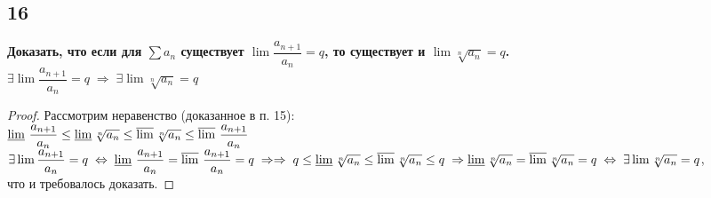 \documentclass[a4paper, fleqn]{article}
\begin{document}
    \subsection*{16}
        \textbf{ Доказать, что если для $\sum a_n$ существует $\lim \dfrac{a_{n+1}}{a_n} = q$, то существует и $\lim \sqrt[n]{a_n} = q$.} \\[5 pt]
        $\exists \lim \dfrac{a_{n+1}}{a_n} = q \; \Rightarrow \; \exists \lim \sqrt[n]{a_n} = q$ \\[3 pt]
        \begin{proof}
        Рассмотрим неравенство (доказанное в п. 15): \\[3 pt]
        $\varliminf \, \dfrac{a_{n+1}}{a_n} \le \varliminf \sqrt[n]{a_n} \le \varlimsup \sqrt[n]{a_n} 
        \le \varlimsup \, \dfrac{a_{n+1}}{a_n}$ \\[3 pt]
        $\exists \lim \dfrac{a_{n+1}}{a_n} = q \; \Leftrightarrow \; 
        \varliminf \, \dfrac{a_{n+1}}{a_n} = \varlimsup \, \dfrac{a_{n+1}}{a_n} = q \; \Rightarrow \\[3 pt]
        \Rightarrow \; q \le \varliminf \sqrt[n]{a_n} \le \varlimsup \sqrt[n]{a_n} \le q \; \Rightarrow 
        \varliminf \sqrt[n]{a_n} = \varlimsup \sqrt[n]{a_n} = q \; \Leftrightarrow \; \exists \lim \sqrt[n]{a_n} = q$, \\[5 pt]
        что и требовалось доказать.
        \end{proof}    
\end{document}
